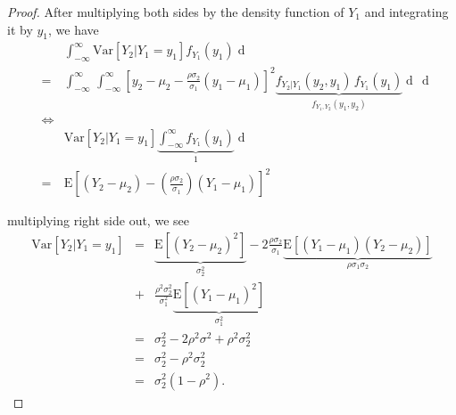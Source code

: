 \documentclass[a4paper, twoside, 11pt]{article}
\theoremstyle{definition}
\newcommand{\sqbr}[1]{\left[ {#1} \right]}
\begin{document}
\begin{proof}
 After multiplying both sides by the density function of $Y_1$ and integrating it by $y_1$, we have
\begin{eqnarray*}
 &\,&\int_{-\infty}^{\infty} \mathrm{Var}[Y_2|Y_1=y_1] f_{Y_1}(y_1) \mathop{dy_1} \\
 &=&\int_{-\infty}^{\infty}\,\int_{-\infty}^{\infty} \sqbr{y_2 - \mu_2 
	- \frac{\rho\sigma_2}{\sigma_1}(y_1-\mu_1)}^2\underbrace{f_{Y_2|Y_1}(y_2, y_1)\,f_{Y_1}(y_1)}_{f_{Y_1, Y_2}(y_1, y_2)} \mathop{dy_2}\,\mathop{dy_1}\\
	&\iff&\\
	&\,&\mathrm{Var}[Y_2|Y_1=y_1] \underbrace{\int_{-\infty}^{\infty}  f_{Y_1}(y_1)}_{1} \mathop{dy_1} \\
	&=& \mathrm{E}\sqbr{(Y_2 - \mu_2) - (\frac{\rho\sigma_2}{\sigma_1})(Y_1 - \mu_1)}^2 
\end{eqnarray*}

multiplying right side out, we see
\begin{eqnarray*}
  \mathrm{Var}[Y_2|Y_1=y_1] &=&\underbrace{\mathrm{E}[(Y_2 - \mu_2)^2]}_{\sigma_2^2} - 2\frac{\rho\sigma_2}{\sigma_1}\underbrace{\mathrm{E}[(Y_1 -\mu_1)(Y_2 - \mu_2)]}_{\rho\sigma_1\sigma_2}\\
  &+& \frac{\rho^2\sigma_2^2}{\sigma_1^2}\underbrace{\mathrm{E}[(Y_1-\mu_1)^2]}_{\sigma_1^2}\\
  &=& \sigma_2^2 - 2\rho^2\sigma^2 + \rho^2\sigma_2^2\\
  &=& \sigma_2^2 - \rho^2\sigma_2^2\\
  &=& \sigma_2^2(1-\rho^2).
\end{eqnarray*} 
\end{proof}
\end{document}
